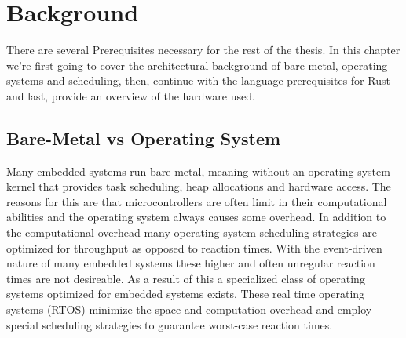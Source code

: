 \chapter{Background}
\label{chap:background}

There are several Prerequisites necessary for the rest of the thesis.
In this chapter we're first going to cover the architectural background of bare-metal, operating systems and scheduling,
then, continue with the language prerequisites for Rust and last, provide an overview of the hardware used.

\section{Bare-Metal vs Operating System}
\label{sec:background:bm_vs_os}

Many embedded systems run bare-metal, meaning without an operating system kernel that provides task scheduling, heap allocations and hardware access.
The reasons for this are that microcontrollers are often limit in their computational abilities and the operating system always causes some overhead.
In addition to the computational overhead many operating system scheduling strategies are optimized for throughput as opposed to reaction times.
With the event-driven nature of many embedded systems these higher and often unregular reaction times are not desireable.
As a result of this a specialized class of operating systems optimized for embedded systems exists.
These real time operating systems (RTOS) minimize the space and computation overhead and employ special scheduling strategies to guarantee worst-case reaction times.

